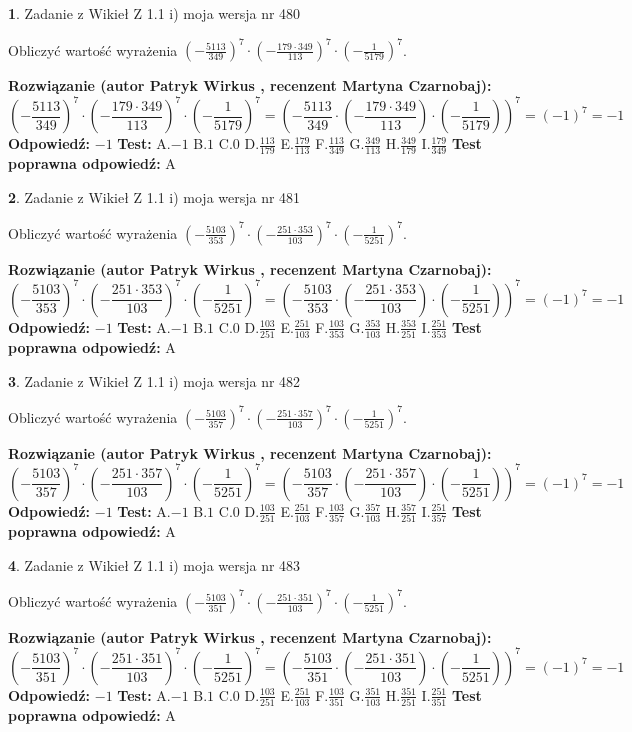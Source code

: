 \documentclass[12pt, a4paper]{article}
\theoremstyle{definition} %
\newtheorem{zad}{}
\newcommand{\zadStart}[1]{\begin{zad}#1\newline}
\newcommand{\zadStop}{\end{zad}}
\newcommand{\rozwStart}[2]{\noindent \textbf{Rozwiązanie (autor #1 , recenzent #2): }\newline}
\newcommand{\rozwStop}{\newline}
\newcommand{\odpStart}{\noindent \textbf{Odpowiedź:}\newline}
\newcommand{\odpStop}{\newline}
\newcommand{\testStart}{\noindent \textbf{Test:}\newline}
\newcommand{\testStop}{\newline}
\newcommand{\kluczStart}{\noindent \textbf{Test poprawna odpowiedź:}\newline}
\newcommand{\kluczStop}{\newline}
\begin{document}
\zadStart{Zadanie z Wikieł Z 1.1 i) moja wersja nr 480}

Obliczyć wartość wyrażenia $(-\frac{5113}{349})^{7} \cdot (-\frac{179 \cdot 349}{113})^{7} \cdot (-\frac{1}{5179})^{7}$.
\zadStop
\rozwStart{Patryk Wirkus}{Martyna Czarnobaj}
$$(-\frac{5113}{349})^{7} \cdot (-\frac{179 \cdot 349}{113})^{7} \cdot (-\frac{1}{5179})^{7} = (-\frac{5113}{349} \cdot (-\frac{179 \cdot 349}{113}) \cdot (-\frac{1}{5179}))^{7} = (-1)^{7} = -1$$
\rozwStop
\odpStart
$-1$
\odpStop
\testStart
A.$-1$ B.$1$ C.$0$ D.$\frac{113}{179}$ E.$\frac{179}{113}$
F.$\frac{113}{349}$ G.$\frac{349}{113}$
H.$\frac{349}{179}$
I.$\frac{179}{349}$
\testStop
\kluczStart
A
\kluczStop



\zadStart{Zadanie z Wikieł Z 1.1 i) moja wersja nr 481}

Obliczyć wartość wyrażenia $(-\frac{5103}{353})^{7} \cdot (-\frac{251 \cdot 353}{103})^{7} \cdot (-\frac{1}{5251})^{7}$.
\zadStop
\rozwStart{Patryk Wirkus}{Martyna Czarnobaj}
$$(-\frac{5103}{353})^{7} \cdot (-\frac{251 \cdot 353}{103})^{7} \cdot (-\frac{1}{5251})^{7} = (-\frac{5103}{353} \cdot (-\frac{251 \cdot 353}{103}) \cdot (-\frac{1}{5251}))^{7} = (-1)^{7} = -1$$
\rozwStop
\odpStart
$-1$
\odpStop
\testStart
A.$-1$ B.$1$ C.$0$ D.$\frac{103}{251}$ E.$\frac{251}{103}$
F.$\frac{103}{353}$ G.$\frac{353}{103}$
H.$\frac{353}{251}$
I.$\frac{251}{353}$
\testStop
\kluczStart
A
\kluczStop



\zadStart{Zadanie z Wikieł Z 1.1 i) moja wersja nr 482}

Obliczyć wartość wyrażenia $(-\frac{5103}{357})^{7} \cdot (-\frac{251 \cdot 357}{103})^{7} \cdot (-\frac{1}{5251})^{7}$.
\zadStop
\rozwStart{Patryk Wirkus}{Martyna Czarnobaj}
$$(-\frac{5103}{357})^{7} \cdot (-\frac{251 \cdot 357}{103})^{7} \cdot (-\frac{1}{5251})^{7} = (-\frac{5103}{357} \cdot (-\frac{251 \cdot 357}{103}) \cdot (-\frac{1}{5251}))^{7} = (-1)^{7} = -1$$
\rozwStop
\odpStart
$-1$
\odpStop
\testStart
A.$-1$ B.$1$ C.$0$ D.$\frac{103}{251}$ E.$\frac{251}{103}$
F.$\frac{103}{357}$ G.$\frac{357}{103}$
H.$\frac{357}{251}$
I.$\frac{251}{357}$
\testStop
\kluczStart
A
\kluczStop



\zadStart{Zadanie z Wikieł Z 1.1 i) moja wersja nr 483}

Obliczyć wartość wyrażenia $(-\frac{5103}{351})^{7} \cdot (-\frac{251 \cdot 351}{103})^{7} \cdot (-\frac{1}{5251})^{7}$.
\zadStop
\rozwStart{Patryk Wirkus}{Martyna Czarnobaj}
$$(-\frac{5103}{351})^{7} \cdot (-\frac{251 \cdot 351}{103})^{7} \cdot (-\frac{1}{5251})^{7} = (-\frac{5103}{351} \cdot (-\frac{251 \cdot 351}{103}) \cdot (-\frac{1}{5251}))^{7} = (-1)^{7} = -1$$
\rozwStop
\odpStart
$-1$
\odpStop
\testStart
A.$-1$ B.$1$ C.$0$ D.$\frac{103}{251}$ E.$\frac{251}{103}$
F.$\frac{103}{351}$ G.$\frac{351}{103}$
H.$\frac{351}{251}$
I.$\frac{251}{351}$
\testStop
\kluczStart
A
\kluczStop
\end{document}
